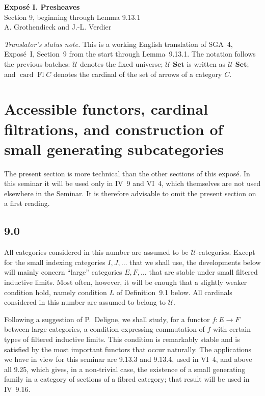 \documentclass[11pt]{article}
\newcommand{\U}{\mathcal{U}}
\newcommand{\Set}{\mathbf{Set}}
\newcommand{\card}{\operatorname{card}}
\newcommand{\Fl}{\operatorname{Fl}}
\begin{document}
\begin{center}
{\Large \textbf{Expos\'e I. Presheaves}}\\[0.35em]
{\large Section 9, beginning through Lemma 9.13.1}\\[0.35em]
A. Grothendieck and J.-L. Verdier
\end{center}

\bigskip

\noindent\emph{Translator's status note.} This is a working English translation of SGA~4, Expos\'e~I, Section~9 from the start through Lemma~9.13.1. The notation follows the previous batches: $\U$ denotes the fixed universe; $\U$-$\Set$ is written as $\U\text{-}\Set$; and $\card \Fl C$ denotes the cardinal of the set of arrows of a category $C$.

\setcounter{section}{8}
\section{Accessible functors, cardinal filtrations, and construction of small generating subcategories}

The present section is more technical than the other sections of this expos\'e. In this seminar it will be used only in IV~9 and VI~4, which themselves are not used elsewhere in the Seminar. It is therefore advisable to omit the present section on a first reading.

\subsection*{9.0}
All categories considered in this number are assumed to be $\U$-categories. Except for the small indexing categories $I,J,\ldots$ that we shall use, the developments below will mainly concern ``large'' categories $E,F,\ldots$ that are stable under small filtered inductive limits. Most often, however, it will be enough that a slightly weaker condition hold, namely condition $L$ of Definition~9.1 below. All cardinals considered in this number are assumed to belong to $\U$.

Following a suggestion of P.~Deligne, we shall study, for a functor $f:E\to F$ between large categories, a condition expressing commutation of $f$ with certain types of filtered inductive limits. This condition is remarkably stable and is satisfied by the most important functors that occur naturally. The applications we have in view for this seminar are 9.13.3 and 9.13.4, used in VI~4, and above all 9.25, which gives, in a non-trivial case, the existence of a small generating family in a category of sections of a fibred category; that result will be used in IV~9.16.
\end{document}
